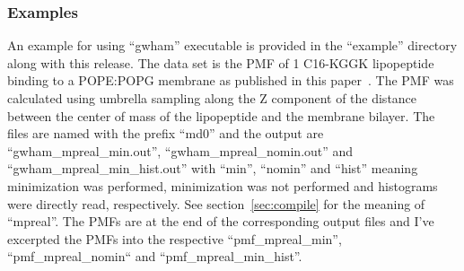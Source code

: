 \subsubsection{Examples}
An example for using ``gwham'' executable is provided in the ``example''
directory along with this release. The data set is the PMF of 1 C16-KGGK
lipopeptide binding to a POPE:POPG membrane as published in this
paper~\cite{Lin2014}. The PMF was calculated using umbrella sampling along the
Z component of the distance between the center of mass of the lipopeptide and
the membrane bilayer.  The files are named with the prefix ``md0'' and the
output are ``gwham\_mpreal\_min.out'', ``gwham\_mpreal\_nomin.out'' and
``gwham\_mpreal\_min\_hist.out'' with ``min'', ``nomin'' and ``hist'' meaning
minimization was performed, minimization was not performed and histograms were
directly read, respectively. See section~\ref{sec:compile} for the meaning of
``mpreal''. The PMFs are at the end of the corresponding output files and I've
excerpted the PMFs into the respective ``pmf\_mpreal\_min'',
``pmf\_mpreal\_nomin`` and ``pmf\_mpreal\_min\_hist''.

